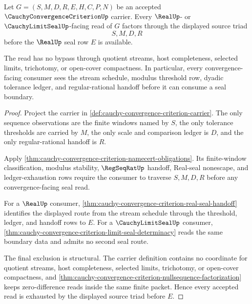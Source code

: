 \begin{theorem}
\label{thm:cauchy-convergence-criterion-source-triad-exhaustion}
Let $G=(S,M,D,R,E,H,C,P,N)$ be an accepted $\CauchyConvergenceCriterionUp$ carrier. Every $\RealUp$- or $\CauchyLimitSealUp$-facing read of $G$ factors through the displayed source triad
$$
S,M,D,R
$$
before the $\RealUp$ seal row $E$ is available.

The read has no bypass through quotient streams, host completeness, selected limits, trichotomy, or open-cover compactness. In particular, every convergence-facing consumer sees the stream schedule, modulus threshold row, dyadic tolerance ledger, and regular-rational handoff before it can consume a seal boundary.
\end{theorem}
\begin{proof}
Project the carrier in \autoref{def:cauchy-convergence-criterion-carrier}. The only sequence observations are the finite windows named by $S$, the only tolerance thresholds are carried by $M$, the only scale and comparison ledger is $D$, and the only regular-rational handoff is $R$.

Apply \autoref{thm:cauchy-convergence-criterion-namecert-obligations}. Its finite-window classification, modulus stability, $\RegSeqRatUp$ handoff, Real-seal nonescape, and ledger-exhaustion rows require the consumer to traverse $S,M,D,R$ before any convergence-facing seal read.

For a $\RealUp$ consumer, \autoref{thm:cauchy-convergence-criterion-real-seal-handoff} identifies the displayed route from the stream schedule through the threshold, ledger, and handoff rows to $E$. For a $\CauchyLimitSealUp$ consumer, \autoref{thm:cauchy-convergence-criterion-limit-seal-determinacy} reads the same boundary data and admits no second seal route.

The final exclusion is structural. The carrier definition contains no coordinate for quotient streams, host completeness, selected limits, trichotomy, or open-cover compactness, and \autoref{thm:cauchy-convergence-criterion-nullsequence-factorization} keeps zero-difference reads inside the same finite packet. Hence every accepted read is exhausted by the displayed source triad before $E$.
\end{proof}

